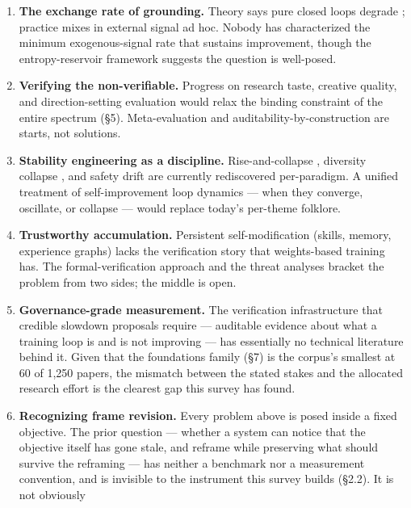 \documentclass[
  11pt,
]{article}
\providecommand{\tightlist}{%
  \setlength{\itemsep}{0pt}\setlength{\parskip}{0pt}}
\begin{document}
\begin{enumerate}
\def\labelenumi{\arabic{enumi}.}
\tightlist
\item
  \textbf{The exchange rate of grounding.} Theory says pure closed loops
  degrade \citep{zenil2026limits}; practice mixes in external signal ad
  hoc. Nobody has characterized the minimum exogenous-signal rate that
  sustains improvement, though the entropy-reservoir framework
  \citep{jingwei2025entropy} suggests the question is well-posed.
\item
  \textbf{Verifying the non-verifiable.} Progress on research taste,
  creative quality, and direction-setting evaluation would relax the
  binding constraint of the entire spectrum (§5). Meta-evaluation
  \citep{sui2026conversation} and auditability-by-construction
  \citep{rasheed2026fluent} are starts, not solutions.
\item
  \textbf{Stability engineering as a discipline.} Rise-and-collapse
  \citep{lin2026self}, diversity collapse \citep{dineen2026vocabulary},
  and safety drift \citep{shi2026healthy} are currently rediscovered
  per-paradigm. A unified treatment of self-improvement loop dynamics
  --- when they converge, oscillate, or collapse --- would replace
  today's per-theme folklore.
\item
  \textbf{Trustworthy accumulation.} Persistent self-modification
  (skills, memory, experience graphs) lacks the verification story that
  weights-based training has. The formal-verification approach
  \citep{yang2026vaso} and the threat analyses \citep{lin2026safety}
  bracket the problem from two sides; the middle is open.
\item
  \textbf{Governance-grade measurement.} The verification infrastructure
  that credible slowdown proposals require \citep{anthropic2026rsi} ---
  auditable evidence about what a training loop is and is not improving
  --- has essentially no technical literature behind it. Given that the
  foundations family (§7) is the corpus's smallest at 60 of 1,250
  papers, the mismatch between the stated stakes and the allocated
  research effort is the clearest gap this survey has found.
\item
  \textbf{Recognizing frame revision.} Every problem above is posed
  inside a fixed objective. The prior question --- whether a system can
  notice that the objective itself has gone stale, and reframe while
  preserving what should survive the reframing --- has neither a
  benchmark nor a measurement convention, and is invisible to the
  instrument this survey builds (§2.2). It is not obviously

\end{enumerate}
\end{document}
